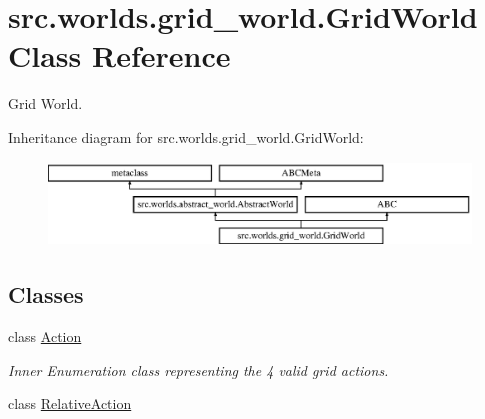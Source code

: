 \hypertarget{classsrc_1_1worlds_1_1grid__world_1_1_grid_world}{}\section{src.\+worlds.\+grid\+\_\+world.\+Grid\+World Class Reference}
\label{classsrc_1_1worlds_1_1grid__world_1_1_grid_world}


Grid World.  


Inheritance diagram for src.\+worlds.\+grid\+\_\+world.\+Grid\+World\+:\begin{figure}[H]
\begin{center}
\leavevmode
\includegraphics[height=2.240000cm]{classsrc_1_1worlds_1_1grid__world_1_1_grid_world}
\end{center}
\end{figure}
\subsection*{Classes}
\begin{DoxyCompactItemize}
\item 
class \hyperlink{classsrc_1_1worlds_1_1grid__world_1_1_grid_world_1_1_action}{Action}
\begin{DoxyCompactList}\small\item\em Inner Enumeration class representing the 4 valid grid actions. \end{DoxyCompactList}\item 
class \hyperlink{classsrc_1_1worlds_1_1grid__world_1_1_grid_world_1_1_relative_action}{Relative\+Action}
\end{DoxyCompactItemize}
